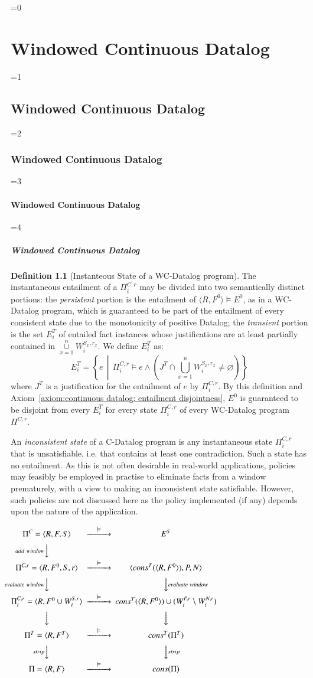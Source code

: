 \documentclass[twocolumn,preprint,3p,number]{elsarticle}
\theoremstyle{plain}
\theoremstyle{definition}
\newtheorem{definition}{Definition}
\newcounter{nestingdepth}
\newenvironment{nestedsection}[2]{
  \ifnum\value{nestingdepth}=0
    \chapter{#1}
  \else
    \ifnum\value{nestingdepth}=1
      \section{#1}
    \else
      \ifnum\value{nestingdepth}=2
        \subsection{#1}
      \else
        \ifnum\value{nestingdepth}=3
          \subsubsection{#1}
        \else
          \ifnum\value{nestingdepth}=4
            \paragraph{#1}
          \else
            \PackageError{nestedsections}{Maximum nesting level exceeded!}{uh oh!}
          \fi
        \fi
      \fi
    \fi
  \fi
  \addtocounter{nestingdepth}{1}
  \label{sec:#2}
}{\addtocounter{nestingdepth}{-1}}
\def\labelfig#1{\label{fig:#1}}
\begin{document}
\begin{nestedsection}{Windowed Continuous Datalog}{semantics}
\begin{definition}[Instanteous State of a WC-Datalog program]
The instantaneous entailment of a $\Pi^{C,r}_i$ may be divided into two
semantically distinct portions: the \emph{persistent} portion is the
entailment of ${\langle R, F^0 \rangle \models E^0}$, as in a WC-Datalog
program, which is guaranteed to be part of the entailment of every consistent
state due to the monotonicity of positive Datalog; the \emph{transient} portion
is the set $E^T_{i}$ of entailed fact instances whose justifications are at
least partially contained in $\mathop{\cup}\limits_{x=1}^n W^{S_x,r_x}_i$.
{\nobreak We define $E^T_i$ as:
\[
E^T_i = \left\{ e \,\middle\vert\, \Pi^{C,r}_i \models e \land \left( J^T \cap \bigcup_{x=1}^n W^{S_x,r_x}_i \neq \varnothing \right) \right\}
\]
where $J^T$ is a justification for the entailment of $e$ by
$\Pi^{C,r}_i$.} By this definition and Axiom~\ref{axiom:continuous
  datalog: entailment disjointness}, $E^0$ is guaranteed to be
disjoint from every $E^T_i$ for every state $\Pi^{C,r}_i$ of every
WC-Datalog program $\Pi^{C,r}$.

An \emph{inconsistent state} of a C-Datalog program is any instantaneous
state $\Pi^{C,r}_i$ that is unsatisfiable, i.e. that contains at least
one contradiction.  Such a state has no entailment.  As this is not often
desirable in real-world applications, policies may feasibly be employed in
practise to eliminate facts from a window prematurely, with a view to making
an inconsistent state satisfiable. However, such policies are not discussed
here as the policy implemented (if any) depends upon the nature of the
application.

\end{definition}

\begin{figure*}
\centering
$
\begin{CD}
  {\Pi^C = \langle R, F, S \rangle} @>\models>> {E^S} \\
  @V{add\ window}VV \\
        {\Pi^{C,r} = \langle R, F^0, S, r \rangle} @>\models>> {\langle cons^T(\langle R, F^0\rangle), P, N \rangle} \\
        @V{evaluate\ window}VV @VV{evaluate\ window}V \\
        {\Pi^{C,r}_i = \langle R, F^0 \cup W^{S,r}_i \rangle} @>\models>> {cons^T(\langle R, F^0 \rangle) \cup (W^{P,r}_i \setminus W^{N,r}_i)} \\
  @VVV @VVV \\
        {\Pi^T = \langle R, F^T \rangle } @>\models>> {cons^T(\Pi^T)} \\
  @V{strip}VV @VV{strip}V \\
        {\Pi = \langle R, F \rangle } @>\models>> {cons(\Pi)}
\end{CD}
$
\caption{Commutative diagram from Continuous Datalog programs to Datalog entailments.}
\labelfig{CD-TD-D}
\end{figure*}


\end{nestedsection}
\end{document}
